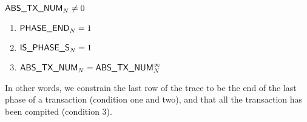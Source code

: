 \If $\textsf{ABS\_TX\_NUM}_{N} \neq 0$ \Then
\begin{enumerate}
    \item $\textsf{PHASE\_END}_{N} = 1$
    \item $\textsf{IS\_PHASE\_S}_{N} = 1$
    \item $\textsf{ABS\_TX\_NUM}_{N} = \textsf{ABS\_TX\_NUM}_{N}^{\infty}$
\end{enumerate}
In other words, we constrain the last row of the trace to be the end of the last phase of a transaction (condition one and two), and that all the transaction has been compited (condition 3).

